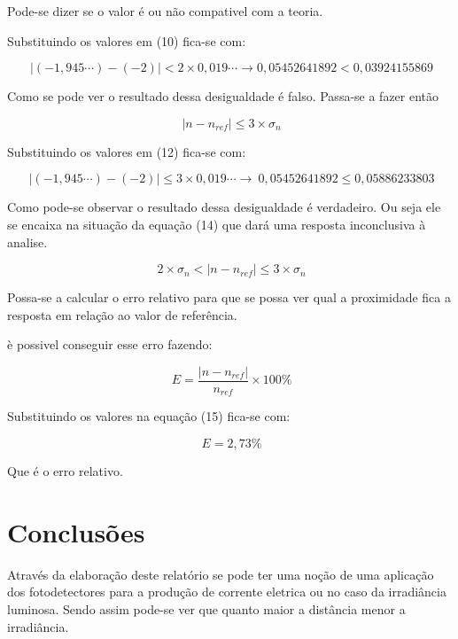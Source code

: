 \documentclass [a4paper, 12pt]{article}
\begin{document}
Pode-se dizer se o valor é ou não compativel com a teoria.

Substituindo os valores em (10) fica-se com:

\begin{equation}
  \ \Big|(-1,945\cdots) - (-2)\Big| < 2\times0,019\cdots \rightarrow 0,05452641892 < 0,03924155869
\end{equation}

Como se pode ver o resultado dessa desigualdade é falso. Passa-se a fazer então 

\begin{equation}
  \ \Big|n - n_{ref}\Big| \le 3\times\sigma_n
\end{equation}

Substituindo os valores em (12) fica-se com:

\begin{equation}
  \ \Big|(-1,945\cdots) - (-2)\Big| \le 3\times0,019\cdots \rightarrow  
  \ 0,05452641892 \le 0,05886233803
\end{equation}

Como pode-se observar o resultado dessa desigualdade é verdadeiro. Ou seja ele se encaixa na situação da equação (14) que dará uma resposta inconclusiva à analise.

\begin{equation}
  \  2\times\sigma_n < \Big|n - n_{ref}\Big| \le 3\times\sigma_n
\end{equation}

Possa-se a calcular o erro relativo para que se possa ver qual a proximidade fica a resposta em relação ao valor de referência.

è possivel conseguir esse erro fazendo:

\begin{equation}
  \  E = \dfrac{\Big|n - n_{ref}\Big|}{n_{ref}} \times 100 \%
\end{equation}

Substituindo os valores na equação (15) fica-se com:

\begin{equation}
  \  E = 2,73\%
\end{equation}

Que é o erro relativo.

\section{Conclusões}

Através da elaboração deste relatório se pode ter uma noção de uma aplicação dos fotodetectores para a produção de corrente eletrica ou no caso da irradiância luminosa. Sendo assim pode-se ver que quanto maior a distância menor a irradiância.
\end{document}
